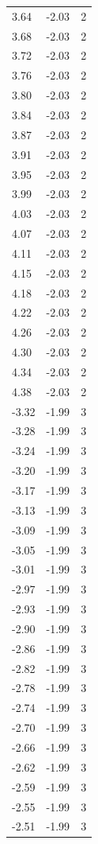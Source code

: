 \begin{longtable}{lrr}
  3.64 & -2.03 & 2 \\
  3.68 & -2.03 & 2 \\
  3.72 & -2.03 & 2 \\
  3.76 & -2.03 & 2 \\
  3.80 & -2.03 & 2 \\
  3.84 & -2.03 & 2 \\
  3.87 & -2.03 & 2 \\
  3.91 & -2.03 & 2 \\
  3.95 & -2.03 & 2 \\
  3.99 & -2.03 & 2 \\
  4.03 & -2.03 & 2 \\
  4.07 & -2.03 & 2 \\
  4.11 & -2.03 & 2 \\
  4.15 & -2.03 & 2 \\
  4.18 & -2.03 & 2 \\
  4.22 & -2.03 & 2 \\
  4.26 & -2.03 & 2 \\
  4.30 & -2.03 & 2 \\
  4.34 & -2.03 & 2 \\
  4.38 & -2.03 & 2 \\
  -3.32 & -1.99 & 3 \\
  -3.28 & -1.99 & 3 \\
  -3.24 & -1.99 & 3 \\
  -3.20 & -1.99 & 3 \\
  -3.17 & -1.99 & 3 \\
  -3.13 & -1.99 & 3 \\
  -3.09 & -1.99 & 3 \\
  -3.05 & -1.99 & 3 \\
  -3.01 & -1.99 & 3 \\
  -2.97 & -1.99 & 3 \\
  -2.93 & -1.99 & 3 \\
  -2.90 & -1.99 & 3 \\
  -2.86 & -1.99 & 3 \\
  -2.82 & -1.99 & 3 \\
  -2.78 & -1.99 & 3 \\
  -2.74 & -1.99 & 3 \\
  -2.70 & -1.99 & 3 \\
  -2.66 & -1.99 & 3 \\
  -2.62 & -1.99 & 3 \\
  -2.59 & -1.99 & 3 \\
  -2.55 & -1.99 & 3 \\
  -2.51 & -1.99 & 3 \\

\end{longtable}
